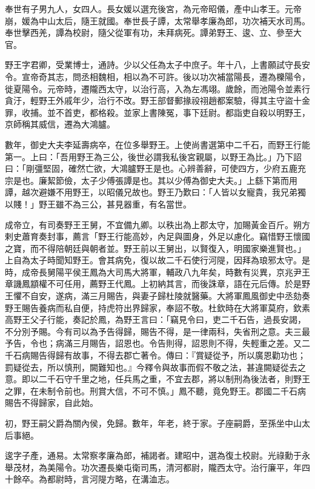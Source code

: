 \begin{pinyinscope}
奉世有子男九人，女四人。長女媛以選充後宮，為元帝昭儀，產中山孝王。元帝崩，媛為中山太后，隨王就國。奉世長子譚，太常舉孝廉為郎，功次補天水司馬。奉世擊西羌，譚為校尉，隨父從軍有功，未拜病死。譚弟野王、逡、立、參至大官。

野王字君卿，受業博士，通詩。少以父任為太子中庶子。年十八，上書願試守長安令。宣帝奇其志，問丞相魏相，相以為不可許。後以功次補當陽長，遷為櫟陽令，徙夏陽令。元帝時，遷隴西太守，以治行高，入為左馮翊。歲餘，而池陽令並素行貪汙，輕野王外戚年少，治行不改。野王部督郵掾祋祤趙都案驗，得其主守盜十金罪，收捕。並不首吏，都格殺。並家上書陳冤，事下廷尉。都詣吏自殺以明野王，京師稱其威信，遷為大鴻臚。

數年，御史大夫李延壽病卒，在位多舉野王。上使尚書選第中二千石，而野王行能第一。上曰：「吾用野王為三公，後世必謂我私後宮親屬，以野王為比。」乃下詔曰：「剛彊堅固，確然亡欲，大鴻臚野王是也。心辨善辭，可使四方，少府五鹿充宗是也。廉絜節儉，太子少傅張譚是也。其以少傅為御史大夫。」上繇下第而用譚，越次避嫌不用野王，以昭儀兄故也。野王乃歎曰：「人皆以女寵貴，我兄弟獨以賤！」野王雖不為三公，甚見器重，有名當世。

成帝立，有司奏野王王舅，不宜備九卿。以秩出為上郡太守，加賜黃金百斤。朔方剌史蕭育奏封事，薦言「野王行能高妙，內足與圖身，外足以慮化。竊惜野王懷國之寶，而不得陪朝廷與朝者並。野王前以王舅出，以賢復入，明國家樂進賢也。」上自為太子時聞知野王。會其病免，復以故二千石使行河隄，因拜為琅邪太守。是時，成帝長舅陽平侯王鳳為大司馬大將軍，輔政八九年矣，時數有災異，京兆尹王章譏鳳顓權不可任用，薦野王代鳳。上初納其言，而後誅章，語在元后傳。於是野王懼不自安，遂病，滿三月賜告，與妻子歸杜陵就醫藥。大將軍鳳風御史中丞劾奏野王賜告養病而私自便，持虎符出界歸家，奉詔不敬。杜欽時在大將軍莫府，欽素高野王父子行能，奏記於鳳，為野王言曰：「竊見令曰，吏二千石告，過長安謁，不分別予賜。今有司以為予告得歸，賜告不得，是一律兩科，失省刑之意。夫三最予告，令也；病滿三月賜告，詔恩也。令告則得，詔恩則不得，失輕重之差。又二千石病賜告得歸有故事，不得去郡亡著令。傳曰：『賞疑從予，所以廣恩勸功也；罰疑從去，所以慎刑，闕難知也。』今釋令與故事而假不敬之法，甚違闕疑從去之意。即以二千石守千里之地，任兵馬之重，不宜去郡，將以制刑為後法者，則野王之罪，在未制令前也。刑賞大信，不可不慎。」鳳不聽，竟免野王。郡國二千石病賜告不得歸家，自此始。

初，野王嗣父爵為關內侯，免歸。數年，年老，終于家。子座嗣爵，至孫坐中山太后事絕。

逡字子產，通易。太常察孝廉為郎，補謁者。建昭中，選為復土校尉。光祿勳于永舉茂材，為美陽令。功次遷長樂屯衛司馬，清河都尉，隴西太守。治行廉平，年四十餘卒。為都尉時，言河隄方略，在溝洫志。


\end{pinyinscope}
